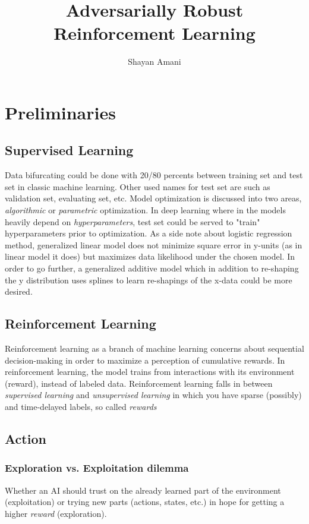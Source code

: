 \documentclass[letterpaper,12pt]{article}
\title{Adversarially Robust Reinforcement Learning}
\author{Shayan Amani}
\begin{document}
\maketitle


\section{Preliminaries}

\subsection{Supervised Learning}
Data bifurcating could be done with 20/80 percents between training set and test set in classic machine learning. Other used names for test set are such as validation set, evaluating set, etc. Model optimization is discussed into two areas, \textit{algorithmic} or \textit{parametric} optimization. In deep learning where in the models heavily depend on \textit{hyperparameters}, test set could be served to "train" hyperparameters prior to optimization. As a side note about logistic regression method, generalized linear model does not minimize square error in y-units (as in linear model it does) but maximizes data likelihood under the chosen model. In order to go further, a generalized additive model which in addition to re-shaping the y distribution uses splines to learn re-shapings of the x-data could be more desired.

\subsection{Reinforcement Learning}
Reinforcement learning as a branch of machine learning concerns about sequential decision-making in order to maximize a perception of cumulative rewards. In reinforcement learning, the model trains from interactions with its environment (reward), instead of labeled data. Reinforcement learning falls in between \textit{supervised learning} and \textit{unsupervised learning} in which you have sparse (possibly) and time-delayed labels, so called \textit{rewards} 

\subsection{Action}

\subsubsection{Exploration vs. Exploitation dilemma}
Whether an AI should trust on the already learned part of the environment (exploitation) or trying new parts (actions, states, etc.) in hope for getting a higher \textit{reward} (exploration). 
\end{document}
